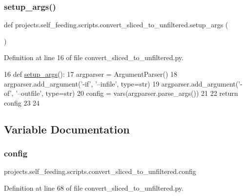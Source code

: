 \mbox{\label{namespaceprojects_1_1self__feeding_1_1scripts_1_1convert__sliced__to__unfiltered_a13c1e69c48c191e9cc6f8d257b79152d}} 
\subsubsection{\texorpdfstring{setup\+\_\+args()}{setup\_args()}}
{\footnotesize\ttfamily def projects.\+self\+\_\+feeding.\+scripts.\+convert\+\_\+sliced\+\_\+to\+\_\+unfiltered.\+setup\+\_\+args (\begin{DoxyParamCaption}{ }\end{DoxyParamCaption})}



Definition at line 16 of file convert\+\_\+sliced\+\_\+to\+\_\+unfiltered.\+py.


\begin{DoxyCode}
16 \textcolor{keyword}{def }\hyperlink{namespaceprojects_1_1self__feeding_1_1scripts_1_1convert__sliced__to__unfiltered_a13c1e69c48c191e9cc6f8d257b79152d}{setup\_args}():
17     argparser = ArgumentParser()
18     argparser.add\_argument(\textcolor{stringliteral}{'-if'}, \textcolor{stringliteral}{'--infile'}, type=str)
19     argparser.add\_argument(\textcolor{stringliteral}{'-of'}, \textcolor{stringliteral}{'--outfile'}, type=str)
20     config = vars(argparser.parse\_args())
21 
22     \textcolor{keywordflow}{return} config
23 
24 
\end{DoxyCode}


\subsection{Variable Documentation}
\mbox{\label{namespaceprojects_1_1self__feeding_1_1scripts_1_1convert__sliced__to__unfiltered_a7138270b9589cbf6a9c6f608a6e50c21}} 
\subsubsection{\texorpdfstring{config}{config}}
{\footnotesize\ttfamily projects.\+self\+\_\+feeding.\+scripts.\+convert\+\_\+sliced\+\_\+to\+\_\+unfiltered.\+config}



Definition at line 68 of file convert\+\_\+sliced\+\_\+to\+\_\+unfiltered.\+py.

